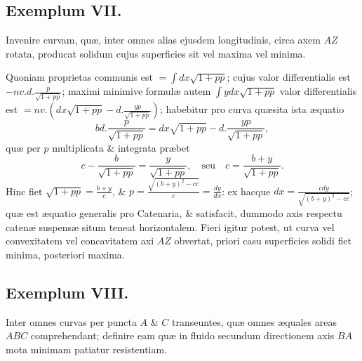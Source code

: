 \subsection*{Exemplum VII.}
Invenire curvam, quæ, inter omnes alias ejusdem longitudinis, circa axem $AZ$ rotata, producat solidum cujus superficies sit vel maxima vel minima.

Quoniam proprietas communis est $=\int dx\sqrt{1+pp}$; cujus valor differentialis est $-nv.d.\frac p{\sqrt{1+pp}}$; maximi minimive formulæ autem $\int ydx\sqrt{1+pp}$ valor differentialis est $=nv.\left(dx\sqrt{1+pp}-d.\frac{yp}{\sqrt{1+pp}}\right)$; habebitur pro curva quæsita ista æquatio
\[bd.\frac p{\sqrt{1+pp}}=dx\sqrt{1+pp}-d.\frac{yp}{\sqrt{1+pp}},\]
quæ per $p$ multiplicata \& integrata præbet
\[c-\frac b{\sqrt{1+pp}}=\frac y{\sqrt{1+pp}},\quad\text{seu}\quad c=\frac{b+y}{\sqrt{1+pp}}.\]
Hinc fiet $\sqrt{1+pp}=\frac{b+y}c$, \& $p=\frac{\sqrt{(b+y)^2-cc}}c=\frac{dy}{dx}$: ex hacque $dx=\frac{cdy}{\sqrt{(b+y)^2-cc}}$; quæ est æquatio generalis pro Catenaria, \& satisfacit, dummodo axis respectu catenæ suspensæ situm teneat horizontalem. Fieri igitur potest, ut curva vel convexitatem vel concavitatem axi $AZ$ obvertat, priori casu superficies solidi fiet minima, posteriori maxima.

\subsection*{Exemplum VIII.}
Inter omnes curvas per puncta $A$ \& $C$ transeuntes, quæ omnes æquales areas $ABC$ comprehendant; definire eam quæ in fluido secundum directionem axis $BA$ mota minimam patiatur resistentiam.

